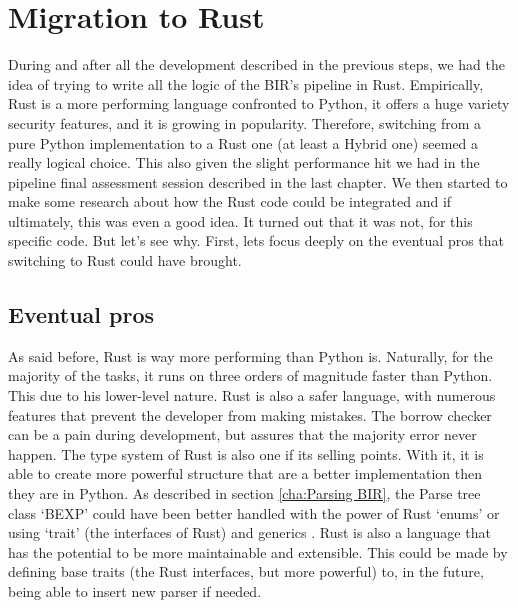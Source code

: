 \chapter{Migration to Rust}
\label{cha:Migration to Rust} During and after all the development described in the
previous steps, we had the idea of trying to write all the logic of the BIR's
pipeline in Rust. Empirically, Rust is a more performing language confronted to
Python, it offers a huge variety security features, and it is growing in
popularity. Therefore, switching from a pure Python implementation to a Rust one
(at least a Hybrid one) seemed a really logical choice. This also given the slight
performance hit we had in the pipeline final assessment session described in the
last chapter. We then started to make some research about how the Rust code
could be integrated and if ultimately, this was even a good idea. It turned out
that it was not, for this specific code. But let's see why. First, lets focus
deeply on the eventual pros that switching to Rust could have brought.

\section[Eventual pros]{Eventual pros}
As said before, Rust is way more performing than Python is. Naturally, for the majority
of the tasks, it runs on three orders of magnitude faster than Python. This due to
his lower-level nature. Rust is also a safer language, with numerous features that
prevent the developer from making mistakes. The borrow checker can be a pain
during development, but assures that the majority error never happen. The type
system of Rust is also one if its selling points. With it, it is able to create
more powerful structure that are a better implementation then they are in Python.
As described in section \ref{cha:Parsing BIR}, the Parse tree class `BEXP' could
have been better handled with the power of Rust `enums' or using `trait' (the interfaces
of Rust) and generics . Rust is also a language that has the potential to be
more maintainable and extensible. This could be made by defining base traits (the
Rust interfaces, but more powerful) to, in the future, being able to insert new
parser if needed.

